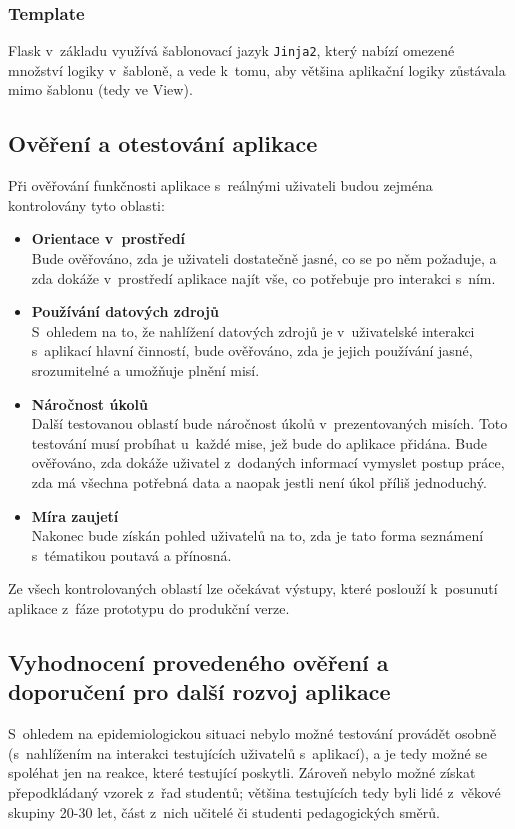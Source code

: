 \subsubsection*{Template}
Flask v~základu využívá šablonovací jazyk \verb|Jinja2|, který nabízí omezené množství logiky v~šabloně, a vede k~tomu, aby většina aplikační logiky zůstávala mimo šablonu (tedy ve View).

\subsection{Ověření a otestování aplikace}
Při ověřování funkčnosti aplikace s~reálnými uživateli budou zejména kontrolovány tyto oblasti: 

\begin{itemize}
	\item \textbf{Orientace v~prostředí}\\
		Bude ověřováno, zda je uživateli dostatečně jasné, co se po něm požaduje, a zda dokáže v~prostředí aplikace najít vše, co potřebuje pro interakci s~ním. 
	\item \textbf{Používání datových zdrojů}\\
		S~ohledem na to, že nahlížení datových zdrojů je v~uživatelské interakci s~aplikací hlavní činností, bude ověřováno, zda je jejich používání jasné, srozumitelné a umožňuje plnění misí. 
	\item \textbf{Náročnost úkolů}\\
		Další testovanou oblastí bude náročnost úkolů v~prezentovaných misích. Toto testování musí probíhat u~každé mise, jež bude do aplikace přidána. Bude ověřováno, zda dokáže uživatel z~dodaných informací vymyslet postup práce, zda má všechna potřebná data a naopak jestli není úkol příliš jednoduchý.
	\item \textbf{Míra zaujetí}\\
		Nakonec bude získán pohled uživatelů na to, zda je tato forma seznámení s~tématikou poutavá a přínosná.
\end{itemize}

Ze všech kontrolovaných oblastí lze očekávat výstupy, které poslouží k~posunutí aplikace z~fáze prototypu do produkční verze.


\subsection{Vyhodnocení provedeného ověření a doporučení pro další rozvoj aplikace}
S~ohledem na epidemiologickou situaci nebylo možné testování provádět osobně (s~nahlížením na interakci testujících uživatelů s~aplikací), a je tedy možné se spoléhat jen na reakce, které testující poskytli. Zároveň nebylo možné získat přepodkládaný vzorek z~řad studentů; většina testujících tedy byli lidé z~věkové skupiny 20-30 let, část z~nich učitelé či studenti pedagogických směrů.

